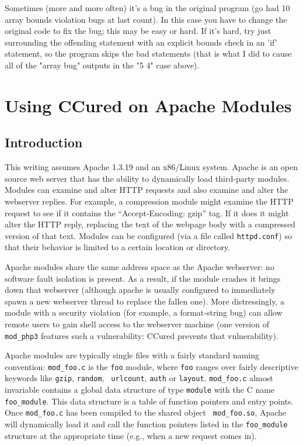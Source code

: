 \documentclass{book}
\begin{document}
Sometimes (more and more often) it's a bug in the original program (go
had 10 array bounds violation bugs at last count).  In this case you
have to change the original code to fix the bug; this may be easy or
hard.  If it's hard, try just surrounding the offending statement with
an explicit bounds check in an 'if' statement, so the program skips
the bad statements (that is what I did to cause all of the "array bug"
outputs in the "5 4" case above).

\chapter{Using CCured on Apache Modules}

\section{Introduction}

This writing assumes Apache 1.3.19 and an x86/Linux system. Apache is an
open source web server that has the ability to dynamically load third-party
modules. Modules can examine and alter HTTP requests and also examine and
alter the webserver replies. For example, a compression module might
examine the HTTP request to see if it contains the ``Accept-Encoding:
gzip'' tag. If it does it might alter the HTTP reply, replacing the text of
the webpage body with a compressed version of that text. Modules can be
configured (via a file called {\tt httpd.conf}) so that their behavior is
limited to a certain location or directory. 

Apache modules share the same address space as the Apache webserver: no
software fault isolation is present. As a result, if the module crashes it
brings down that webserver (although apache is usually configured to
immediately spawn a new webserver thread to replace the fallen one). More
distressingly, a module with a security violation (for example, a
format-string bug) can allow remote users to gain shell access to the
webserver machine (one version of {\tt mod\_php3} features such a
vulnerability: CCured prevents that vulnerability). 

Apache modules are typically single files with a fairly standard naming
convention: {\tt mod\_foo.c} is the {\tt foo} module, where {\tt foo}
ranges over fairly descriptive keywords like {\tt gzip}, {\tt random}, {\tt
urlcount}, {\tt auth} or {\tt layout}. {\tt mod\_foo.c} almost invariable
contains a global data structure of type {\tt module} with the C name {\tt
foo\_module}. This data structure is a table of function pointers and entry
points. Once {\tt mod\_foo.c} has been compiled to the shared object {\tt
mod\_foo.so}, Apache will dynamically load it and call the function
pointers listed in the {\tt foo\_module} structure at the appropriate time
(e.g., when a new request comes in). 
\end{document}
